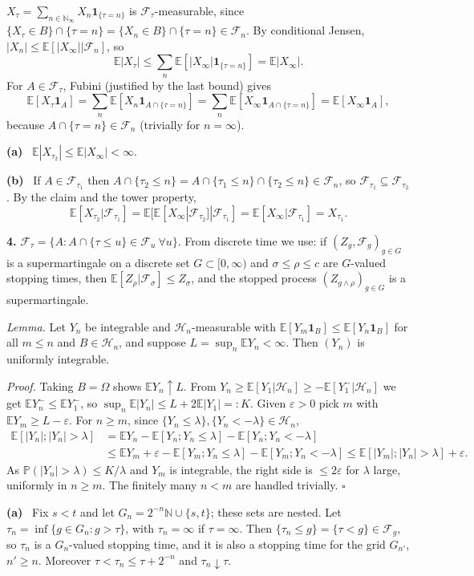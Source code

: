 \documentclass[11pt,a4paper]{article}
\newcommand{\E}{\mathbb{E}}
\renewcommand{\P}{\mathbb{P}}
\newcommand{\N}{\mathbb{N}}
\newcommand{\F}{\mathcal{F}}
\newcommand{\Hc}{\mathcal{H}}
\newcommand{\1}{\mathbf{1}}
\newcommand{\prob}[1]{\par\medskip\noindent\textbf{#1}\quad}
\newcommand{\sub}[1]{\par\smallskip\noindent\textbf{#1}\ }
\begin{document}
$X_\tau=\sum_{n\in\N_\infty}X_n\1_{\{\tau=n\}}$ is $\F_\tau$-measurable, since
$\{X_\tau\in B\}\cap\{\tau=n\}=\{X_n\in B\}\cap\{\tau=n\}\in\F_n$. By conditional Jensen, $|X_n|\le\E[|X_\infty||\F_n]$, so
\[\E|X_\tau|\le\sum_n\E[|X_\infty|\1_{\{\tau=n\}}]=\E|X_\infty|.\]
For $A\in\F_\tau$, Fubini (justified by the last bound) gives
\[\E[X_\tau\1_A]=\sum_n\E[X_n\1_{A\cap\{\tau=n\}}]=\sum_n\E[X_\infty\1_{A\cap\{\tau=n\}}]=\E[X_\infty\1_A],\]
because $A\cap\{\tau=n\}\in\F_n$ (trivially for $n=\infty$).

\sub{(a)} $\E|X_{\tau_2}|\le\E|X_\infty|<\infty$.

\sub{(b)} If $A\in\F_{\tau_1}$ then $A\cap\{\tau_2\le n\}=A\cap\{\tau_1\le n\}\cap\{\tau_2\le n\}\in\F_n$, so
$\F_{\tau_1}\subseteq\F_{\tau_2}$. By the claim and the tower property,
\[\E[X_{\tau_2}|\F_{\tau_1}]=\E[\E[X_\infty|\F_{\tau_2}]|\F_{\tau_1}]=\E[X_\infty|\F_{\tau_1}]=X_{\tau_1}.\]

\prob{4.}
$\F_\tau=\{A:A\cap\{\tau\le u\}\in\F_u\ \forall u\}$. From discrete time we use: if $(Z_g,\F_g)_{g\in G}$ is a
supermartingale on a discrete set $G\subset[0,\infty)$ and $\sigma\le\rho\le c$ are $G$-valued stopping
times, then $\E[Z_\rho|\F_\sigma]\le Z_\sigma$, and the stopped process $(Z_{g\wedge\rho})_{g\in G}$ is a
supermartingale.

\emph{Lemma.} Let $Y_n$ be integrable and $\Hc_n$-measurable with $\E[Y_m\1_B]\le\E[Y_n\1_B]$ for all $m\le n$ and
$B\in\Hc_n$, and suppose $L=\sup_n\E Y_n<\infty$. Then $(Y_n)$ is uniformly integrable.

\emph{Proof.} Taking $B=\Omega$ shows $\E Y_n\uparrow L$. From $Y_n\ge\E[Y_1|\Hc_n]\ge-\E[Y_1^-|\Hc_n]$ we get $\E Y_n^-\le\E Y_1^-$, so
$\sup_n\E|Y_n|\le L+2\E|Y_1|=:K$. Given $\varepsilon>0$ pick $m$ with $\E Y_m\ge L-\varepsilon$. For $n\ge m$, since
$\{Y_n\le\lambda\},\{Y_n<-\lambda\}\in\Hc_n$,
\begin{align*}
\E[|Y_n|;|Y_n|>\lambda]&=\E Y_n-\E[Y_n;Y_n\le\lambda]-\E[Y_n;Y_n<-\lambda]\\
&\le\E Y_m+\varepsilon-\E[Y_m;Y_n\le\lambda]-\E[Y_m;Y_n<-\lambda]\le\E[|Y_m|;|Y_n|>\lambda]+\varepsilon .
\end{align*}
As $\P(|Y_n|>\lambda)\le K/\lambda$ and $Y_m$ is integrable, the right side is $\le2\varepsilon$ for $\lambda$ large, uniformly in $n\ge m$.
The finitely many $n<m$ are handled trivially. \hfill$\square$

\sub{(a)} Fix $s<t$ and let $G_n=2^{-n}\N\cup\{s,t\}$; these sets are nested. Let $\tau_n=\inf\{g\in G_n:g>\tau\}$, with $\tau_n=\infty$ if
$\tau=\infty$. Then $\{\tau_n\le g\}=\{\tau<g\}\in\F_g$, so $\tau_n$ is a $G_n$-valued stopping time, and
it is also a stopping time for the grid $G_{n'}$, $n'\ge n$. Moreover $\tau<\tau_n\le\tau+2^{-n}$ and $\tau_n\downarrow\tau$.
\end{document}
